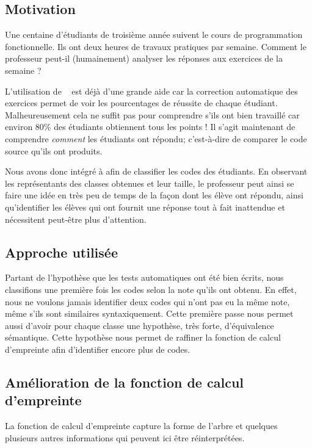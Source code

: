 
\subsection{Motivation}
Une centaine d'étudiants de troisième année suivent le cours de
programmation fonctionnelle. Ils ont deux heures de travaux pratiques
par semaine. Comment le professeur peut-il (humainement) analyser les
réponses aux exercices de la semaine ?

L'utilisation de {\LearnOCaml}~\cite{learnocaml} est déjà d'une grande
aide car la correction automatique des exercices permet de voir les
pourcentages de réussite de chaque étudiant. Malheureusement cela ne
suffit pas pour comprendre s'ils ont bien travaillé car environ 80\%
des étudiants obtiennent tous les points ! Il s'agit maintenant de
comprendre \emph{comment} les étudiants ont répondu; c'est-à-dire de
comparer le code source qu'ils ont produits.

Nous avons donc intégré {\Asak} à {\LearnOCaml} afin de classifier les
codes des étudiants. En observant les représentants des classes
obtenues et leur taille, le professeur peut ainsi se faire une idée en
très peu de temps de la façon dont les élève ont répondu, ainsi
qu'identifier les élèves qui ont fournit une réponse tout à fait
inattendue et nécessitent peut-être plus d'attention.

\subsection{Approche utilisée}
Partant de l'hypothèse que les tests automatiques ont été bien écrits,
nous classifions une première fois les codes selon la note qu'ils ont
obtenu. En effet, nous ne voulons jamais identifier deux codes qui
n'ont pas eu la même note, même s'ils sont similaires
syntaxiquement. Cette première passe nous permet aussi d'avoir pour
chaque classe une hypothèse, très forte, d'équivalence sémantique.
Cette hypothèse nous permet de raffiner la fonction de calcul
d'empreinte afin d'identifier encore plus de codes.

\subsection{Amélioration de la fonction de calcul d'empreinte}
La fonction de calcul d'empreinte capture la forme de l'arbre et
quelques plusieurs autres informations qui peuvent ici être
réinterprétées.


